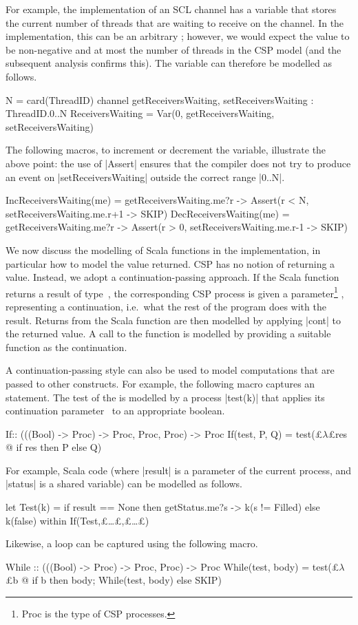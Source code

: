 For example, the implementation of an SCL channel has a variable
 that stores the current number of threads that are
waiting to receive on the channel.  In the implementation, this can be an
arbitrary ; however, we would expect the value to be non-negative
and at most the number of threads in the CSP model (and the subsequent
analysis confirms this).  The variable can therefore be modelled as follows.
%
\begin{cspm}
N = card(ThreadID)
channel getReceiversWaiting, setReceiversWaiting : ThreadID.{0..N}
ReceiversWaiting = Var(0, getReceiversWaiting, setReceiversWaiting)
\end{cspm}
%
The following macros, to increment or decrement the 
variable, illustrate the above point: the use of |Assert| ensures that the
compiler does not try to produce an event on |setReceiversWaiting| outside the
correct range |{0..N}|.
%
\begin{cspm}
IncReceiversWaiting(me) =
  getReceiversWaiting.me?r -> Assert(r < N, setReceiversWaiting.me.r+1 -> SKIP)
DecReceiversWaiting(me) = 
  getReceiversWaiting.me?r -> Assert(r > 0, setReceiversWaiting.me.r-1 -> SKIP)
\end{cspm}

We now discuss the modelling of Scala functions in the implementation, in
particular how to model the value returned.  CSP has no notion of returning a
value.  Instead, we adopt a continuation-passing approach.  If the Scala
function returns a result of type~, the corresponding CSP process is
given a parameter\footnote{{\cspmstyle Proc} is the type of CSP processes.}
, representing a continuation, i.e.~what the rest of
the program does with the result.  Returns from the Scala function are then
modelled by applying |cont| to the returned value.  A call to the function is
modelled by providing a suitable function as the continuation.

A continuation-passing style can also be used to model computations that are
passed to other constructs.  For example, the following macro captures an
 statement.  The test of the  is modelled by a process
|test(k)| that applies its continuation parameter~ to
an appropriate boolean.
%
\begin{cspm}
If:: (((Bool) -> Proc) -> Proc, Proc, Proc) -> Proc
If(test, P, Q) = test(£$\lambda$£res @ if res then P else Q)
\end{cspm}
%
For example, Scala code  (where |result| is a parameter of the current process, and
|status| is a shared variable) can be modelled as follows. 
%
\begin{cspm}
let Test(k) = if result == None then getStatus.me?s -> k(s != Filled) else k(false) within If(Test,£\ldots£,£\ldots£)
\end{cspm}
%
Likewise, a  loop can be captured using the following macro.
%
\begin{cspm}
While :: (((Bool) -> Proc) -> Proc, Proc) -> Proc
While(test, body) = test(£$\lambda$£b @ if b then body; While(test, body) else SKIP)
\end{cspm}
